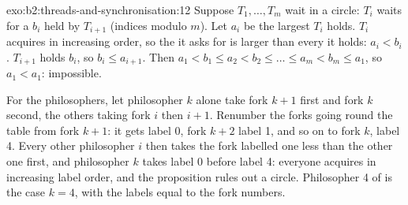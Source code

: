 \begin{solution}{exo:b2:threads-and-synchronisation:12}
Suppose  $T_1, \dots, T_m$ wait in a circle: $T_i$ waits for a  $b_i$ held by $T_{i+1}$ (indices modulo
$m$). Let $a_i$ be the largest  $T_i$ holds. $T_i$ acquires in increasing order, so the  it asks for is larger
than every  it holds: $a_i < b_i$. $T_{i+1}$ holds $b_i$, so $b_i \le a_{i+1}$. Then
$a_1 < b_1 \le a_2 < b_2 \le \dots \le a_m < b_m \le a_1$, so $a_1 < a_1$: impossible.

For the philosophers, let philosopher $k$ alone take fork $k + 1$ first and fork $k$ second, the others taking fork
$i$ then $i + 1$. Renumber the forks going round the table from fork $k + 1$: it gets label 0, fork $k + 2$ label 1,
and so on to fork $k$, label 4. Every other philosopher $i$ then takes the fork labelled one less than the other one
first, and philosopher $k$ takes label 0 before label 4: everyone acquires in increasing label order, and the
proposition rules out a circle. Philosopher 4 of  is the case $k = 4$, with the labels
equal to the fork numbers.
\end{solution}


